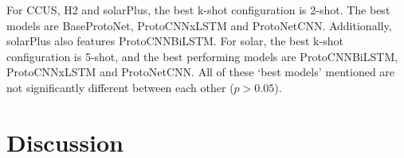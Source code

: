 \documentclass[letterpaper]{article} %
\begin{document}
\begin{table}
  \centering
  \caption{Best performing model configuration for each dataset}
  \label{table:bestModels}
\end{table}
For CCUS, H2 and solarPlus, the best k-shot configuration 
is 2-shot. The best models are BaseProtoNet, ProtoCNNxLSTM and ProtoNetCNN. Additionally, solarPlus also features ProtoCNNBiLSTM.
For solar, the best k-shot configuration is 5-shot, and the best performing models are ProtoCNNBiLSTM, ProtoCNNxLSTM and ProtoNetCNN.
All of these `best models' mentioned are not significantly different between each other (\( p>0.05\)).

\section{Discussion}
\end{document}
